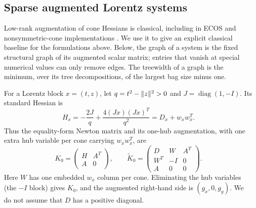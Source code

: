 \subsection{Sparse augmented Lorentz systems}

Low-rank augmentation of cone Hessians is classical, including in
ECOS and nonsymmetric-cone implementations
\citep{DomahidiChuBoyd2013,ChenGoulart2025}.  We use it to give an
explicit classical baseline for the formulations above.  Below, the graph
of a system is the fixed structural graph of its augmented scalar matrix;
entries that vanish at special numerical values can only remove edges.
The treewidth of a graph is the minimum, over its tree decompositions,
of the largest bag size minus one.

For a Lorentz block $x=(t,z)$, let $q=t^2-\lVert z\rVert^2>0$ and
$J=\operatorname{diag}(1,-I)$.  Its standard Hessian is
\begin{equation}\label{newt:one-hub}
 H_x=-\frac{2J}{q}+\frac{4(Jx)(Jx)^T}{q^2}
       =D_x+w_xw_x^T.
\end{equation}
Thus the equality-form Newton matrix and its one-hub augmentation, with
one extra hub variable per cone carrying $w_xw_x^T$, are
\begin{equation}\label{newt:augmented}
 K_0=\begin{pmatrix}H&A^T\\A&0\end{pmatrix},\qquad
 \widetilde K_0=
 \begin{pmatrix}D&W&A^T\\W^T&-I&0\\A&0&0\end{pmatrix}.
\end{equation}
Here $W$ has one embedded $w_x$ column per cone.  Eliminating the hub variables
(the $-I$ block) gives $K_0$, and the augmented right-hand side is $(g_x,0,g_y)$.
We do not assume that $D$ has a positive diagonal.

